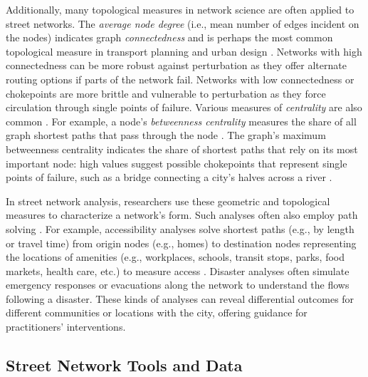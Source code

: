 \documentclass[12pt,letterpaper]{article} %
\begin{document}
Additionally, many topological measures in network science are often applied to street networks. The \textit{average node degree} (i.e., mean number of edges incident on the nodes) indicates graph \textit{connectedness} and is perhaps the most common topological measure in transport planning and urban design \citep{barrington-leigh_century_2015,barrington-leigh_more_2017,barrington-leigh_global_2020}. Networks with high connectedness can be more robust against perturbation as they offer alternate routing options if parts of the network fail. Networks with low connectedness or chokepoints are more brittle and vulnerable to perturbation as they force circulation through single points of failure. Various measures of \textit{centrality} are also common \citep{crucitti_centrality_2006}. For example, a node's \textit{betweenness centrality} measures the share of all graph shortest paths that pass through the node \citep{barthelemy_betweenness_2004,barthelemy_self-organization_2013}. The graph's maximum betweenness centrality indicates the share of shortest paths that rely on its most important node: high values suggest possible chokepoints that represent single points of failure, such as a bridge connecting a city's halves across a river \citep{boeing_resilient_2024}.

In street network analysis, researchers use these geometric and topological measures to characterize a network's form. Such analyses often also employ path solving \citep{miller_measuring_1999,wang_road_2020}. For example, accessibility analyses solve shortest paths (e.g., by length or travel time) from origin nodes (e.g., homes) to destination nodes representing the locations of amenities (e.g., workplaces, schools, transit stops, parks, food markets, health care, etc.) to measure access \citep{foti_behavioral_2014,liu_generalized_2021}. Disaster analyses often simulate emergency responses or evacuations along the network to understand the flows following a disaster. These kinds of analyses can reveal differential outcomes for different communities or locations with the city, offering guidance for practitioners' interventions.

\subsection{Street Network Tools and Data}
\end{document}
